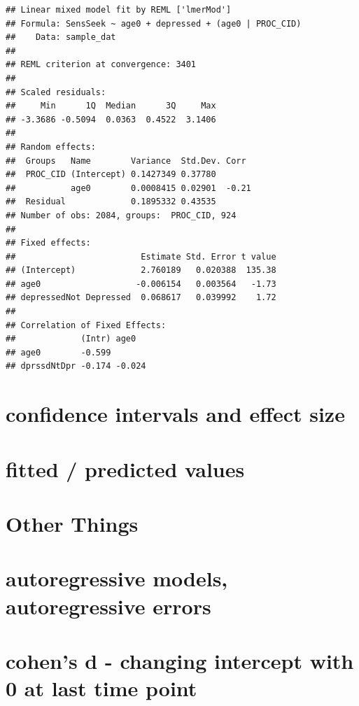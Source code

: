 \documentclass[ignorenonframetext,]{beamer}
\begin{document}
\begin{frame}[fragile]

\tiny

\begin{verbatim}
## Linear mixed model fit by REML ['lmerMod']
## Formula: SensSeek ~ age0 + depressed + (age0 | PROC_CID)
##    Data: sample_dat
## 
## REML criterion at convergence: 3401
## 
## Scaled residuals: 
##     Min      1Q  Median      3Q     Max 
## -3.3686 -0.5094  0.0363  0.4522  3.1406 
## 
## Random effects:
##  Groups   Name        Variance  Std.Dev. Corr 
##  PROC_CID (Intercept) 0.1427349 0.37780       
##           age0        0.0008415 0.02901  -0.21
##  Residual             0.1895332 0.43535       
## Number of obs: 2084, groups:  PROC_CID, 924
## 
## Fixed effects:
##                         Estimate Std. Error t value
## (Intercept)             2.760189   0.020388  135.38
## age0                   -0.006154   0.003564   -1.73
## depressedNot Depressed  0.068617   0.039992    1.72
## 
## Correlation of Fixed Effects:
##             (Intr) age0  
## age0        -0.599       
## dprssdNtDpr -0.174 -0.024
\end{verbatim}

\normalsize

\end{frame}

\section{confidence intervals and effect
size}\label{confidence-intervals-and-effect-size}

\section{fitted / predicted values}\label{fitted-predicted-values}

\section{Other Things}\label{other-things}

\section{autoregressive models, autoregressive
errors}\label{autoregressive-models-autoregressive-errors}

\section{cohen's d - changing intercept with 0 at last time
point}\label{cohens-d---changing-intercept-with-0-at-last-time-point}
\end{document}
